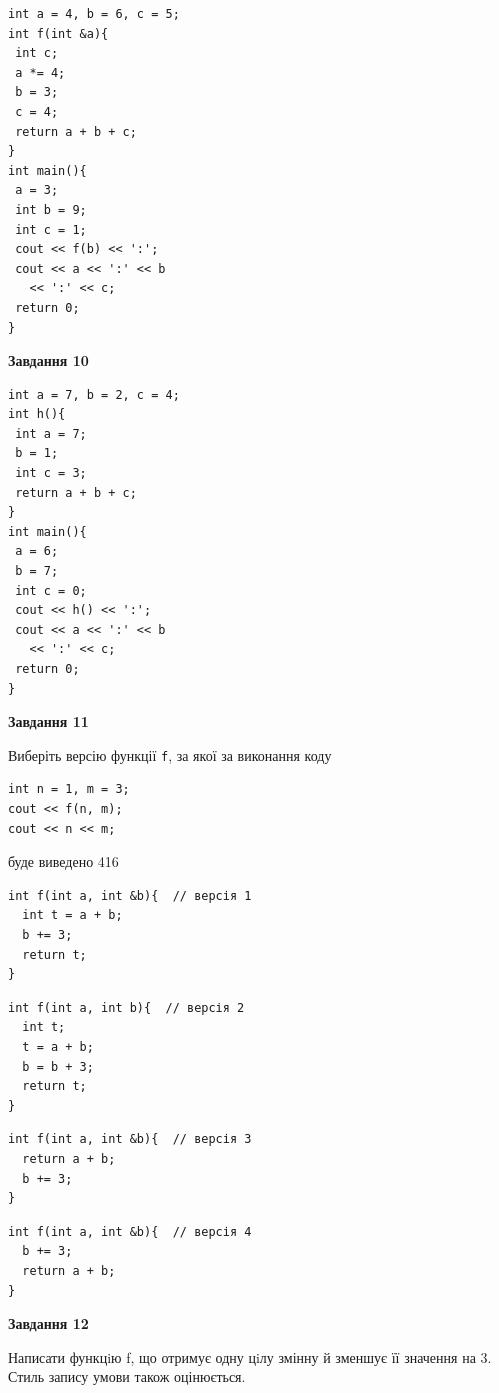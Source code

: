 \documentclass[12pt, ukrainian]{article}
\def\code#1{\Verb!#1!}
\begin{document}
{\begin {large}
\begin{minipage}[t]{7.0cm}
\begin{verbatim}
int a = 4, b = 6, c = 5;
int f(int &a){
 int c;
 a *= 4;
 b = 3;
 c = 4;
 return a + b + c;
}
int main(){
 a = 3;
 int b = 9;
 int c = 1;
 cout << f(b) << ':';
 cout << a << ':' << b 
   << ':' << c;
 return 0;
}
\end{verbatim}



\begin{center}
\textbf{Завдання 10}
\end{center}
\vspace{-8mm}

\begin{verbatim}
int a = 7, b = 2, c = 4;
int h(){
 int a = 7;
 b = 1;
 int c = 3;
 return a + b + c;
}
int main(){
 a = 6;
 b = 7;
 int c = 0;
 cout << h() << ':';
 cout << a << ':' << b 
   << ':' << c;
 return 0;
}
\end{verbatim}

\end{minipage}
\vline \hspace{1mm}
\begin{minipage}[t]{11.0cm}

\begin{center}
\textbf{Завдання 11}
\end{center}
Виберіть версію функції \code{f}, за якої за виконання коду
\begin{verbatim}
int n = 1, m = 3;
cout << f(n, m);
cout << n << m;
\end{verbatim}

буде виведено 416

\begin{verbatim}
int f(int a, int &b){  // версія 1
  int t = a + b;
  b += 3;
  return t;
}
\end{verbatim}

\vspace{-8mm}\begin{verbatim}
int f(int a, int b){  // версія 2
  int t;
  t = a + b;
  b = b + 3;
  return t;
}
\end{verbatim}

\vspace{-8mm}\begin{verbatim}
int f(int a, int &b){  // версія 3
  return a + b;
  b += 3;
}
\end{verbatim}

\vspace{-8mm}\begin{verbatim}
int f(int a, int &b){  // версія 4
  b += 3;
  return a + b;
}
\end{verbatim}



\begin{center}
\textbf{Завдання 12}
\end{center}

Написати функцiю f, що отримує одну цiлу змінну й зменшує її значення на 3. Стиль запису умови також оцінюється.\par

\end{minipage}

\end {large}}
\newpage
\end{document}
